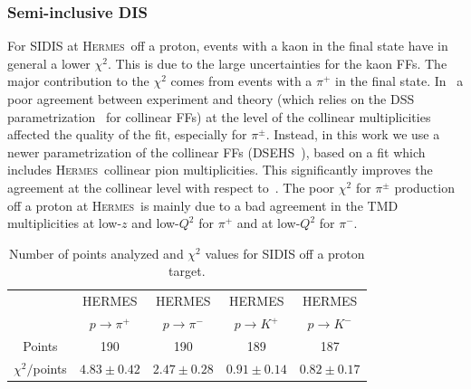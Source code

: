 \documentclass[aps,preprintnumbers,showpacs,nofootinbib,superscriptaddress,floatfix]{revtex4}
\newcommand{\AS}[1]{{\textcolor[rgb]{1,0,1}{#1}}}
\newcommand{\hermes}{\textsc{Hermes}}
\begin{document}
\subsubsection*{Semi-inclusive DIS}
\label{sss:SIDIS_agreement}


For SIDIS at \hermes\ off a proton, events with a kaon in the final state have in general a lower $\chi^2$. This is due to the large uncertainties for the kaon FFs. 
The major contribution to the $\chi^2$ comes from events with a $\pi^+$ in the final state. 
In~\cite{Signori:2013mda,Signori:2013gra} a poor agreement between experiment and theory (which relies on the DSS parametrization~\cite{deFlorian:2007aj} for collinear FFs) at the level of the collinear multiplicities affected the quality of the fit, especially for $\pi^\pm$. Instead, in this work we use a newer parametrization of the collinear FFs (DSEHS~\cite{deFlorian:2014xna}), based on a fit which includes \hermes\ collinear pion multiplicities. This significantly improves the agreement at the collinear level with respect to~\cite{Signori:2013mda,Signori:2013gra}. 
The poor $\chi^2$ for $\pi^\pm$ production off a proton at \hermes\ is mainly due to a bad agreement in the TMD \AS{multiplicities} \AS{at low-$z$ and low-$Q^2$ for $\pi^+$ and at low-$Q^2$ for $\pi^-$. } 

\begin{table}[h!]
\begin{center}
\begin{tabular}{|c|c|c|c|c|}
 \hline
\hline
  & HERMES & HERMES & HERMES & HERMES \\   
 &  $p \to \pi^+$    &   $p \to \pi^-$    &  $p \to K^+$    &   $p \to K^-$
 \\
 \hline
 Points         &  190 & 190 & 189 & 187       \\
 \hline
$\chi^2 /$points & $4 .83\pm 0.42$ & $2 .47\pm 0.28$ & $0 .91\pm 0.14$ & $0 .82\pm 0.17$   \\            
\hline
\hline
\end{tabular}
\caption{Number of points analyzed and $\chi^2$ values for SIDIS off a proton target.}
\label{t:fl_ind_chi2_eP}
\end{center}
\end{table}
\end{document}

